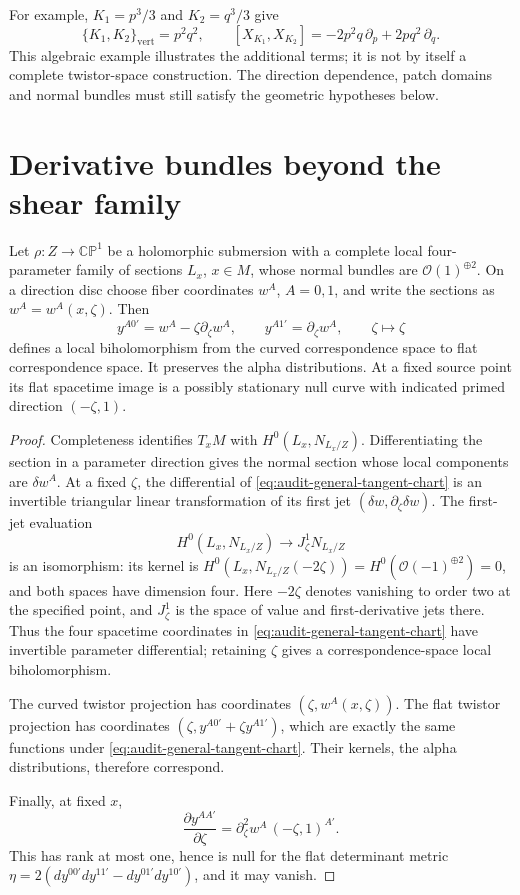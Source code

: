 For example, $K_1=p^3/3$ and $K_2=q^3/3$ give
\[
\{K_1,K_2\}_{\mathrm{vert}}=p^2q^2,
\qquad
[X_{K_1},X_{K_2}]
=-2p^2q\,\partial_p+2pq^2\,\partial_q.
\]
This algebraic example illustrates the additional terms; it is not by
itself a complete twistor-space construction. The direction dependence,
patch domains and normal bundles must still satisfy the geometric
hypotheses below.

\section{Derivative bundles beyond the shear family}

\begin{proposition}
Let $\rho:Z\to\mathbb{CP}^1$ be a holomorphic submersion with a complete
local four-parameter family of sections $L_x$, $x\in M$, whose normal
bundles are $\mathcal O(1)^{\oplus2}$. On a direction disc choose fiber
coordinates $w^A$, $A=0,1$, and write the sections as
$w^A=w^A(x,\zeta)$. Then
\begin{equation}\label{eq:audit-general-tangent-chart}
y^{A0'}=w^A-\zeta\partial_\zeta w^A,
\qquad
y^{A1'}=\partial_\zeta w^A,
\qquad \zeta\longmapsto\zeta
\end{equation}
defines a local biholomorphism from the curved correspondence space
to flat correspondence space. It preserves the alpha distributions.
At a fixed source point its flat spacetime image is a possibly stationary
null curve with indicated primed direction $(-\zeta,1)$.
\end{proposition}
\begin{proof}
Completeness identifies $T_xM$ with $H^0(L_x,N_{L_x/Z})$. Differentiating
the section in a parameter direction gives the normal section whose
local components are $\delta w^A$. At a fixed $\zeta$, the differential
of \eqref{eq:audit-general-tangent-chart} is an invertible triangular
linear transformation of its first jet $(\delta w,\partial_\zeta\delta w)$.
The first-jet evaluation
\[
H^0(L_x,N_{L_x/Z})\longrightarrow J^1_\zeta N_{L_x/Z}
\]
is an isomorphism: its kernel is
$H^0(L_x,N_{L_x/Z}(-2\zeta))=H^0(\mathcal O(-1)^{\oplus2})=0$,
and both spaces have dimension four. Here $-2\zeta$ denotes vanishing
to order two at the specified point, and $J^1_\zeta$ is the space of
value and first-derivative jets there. Thus the four spacetime
coordinates in \eqref{eq:audit-general-tangent-chart} have invertible
parameter differential; retaining $\zeta$ gives a correspondence-space
local biholomorphism.

The curved twistor projection has coordinates $(\zeta,w^A(x,\zeta))$.
The flat twistor projection has coordinates
$(\zeta,y^{A0'}+\zeta y^{A1'})$, which are exactly the same functions
under \eqref{eq:audit-general-tangent-chart}. Their kernels, the alpha
distributions, therefore correspond.

Finally, at fixed $x$,
\[
\frac{\partial y^{AA'}}{\partial\zeta}
=\partial_\zeta^2w^A\,(-\zeta,1)^{A'}.
\]
This has rank at most one, hence is null for the flat determinant metric
$\eta=2(dy^{00'}dy^{11'}-dy^{01'}dy^{10'})$, and it may vanish.
\end{proof}

